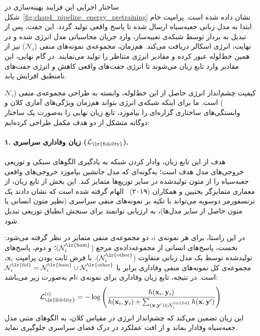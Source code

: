 ساختار اجرایی این فرایند بهینه‌سازی در شکل~\ref{fig:chap4_pipeline_energy_pretraining} نشان داده شده است. پرامپت خام ابتدا به مدل زبانی جعبه‌سیاه ارسال شده تا پاسخ واقعی تولید گردد. این جفت، پس از تبدیل به بردار توسط شبکه‌ی تعبیه‌ساز، وارد جریان محاسباتی مدل انرژی شده و در نهایت، انرژی اسکالر دریافت می‌کند. هم‌زمان، مجموعه‌ی نمونه‌های منفی ($\mathcal{N}_i$) نیز از همین خط‌لوله عبور کرده و مقادیر انرژی متناظر را تولید می‌نمایند. در گام نهایی، این مقادیر وارد تابع زیان  می‌شوند تا انرژی جفت‌های واقعی کاهش و انرژی جفت‌های نامنطبق افزایش یابد.

کیفیت چشم‌انداز انرژی حاصل از این خط‌لوله، وابسته به طراحی مجموعه‌ی منفی ($\mathcal{N}_i$) است. ما برای اینکه شبکه‌ی انرژی بتواند هم‌زمان ویژگی‌های آماری کلان و وابستگی‌های ساختاری گزاره‌ای را بیاموزد، تابع زیان نهایی را به‌صورت یک ساختار دوگانه متشکل از دو هدف مکمل طراحی کرده‌ایم:

\paragraph{۱. زیان وفاداری سراسری ($\mathcal{L}_{\text{\lr{fidelity}}}$).}
هدف از این تابع زیان، وادار کردن شبکه به یادگیری الگوهای سبکی و توزیعی خروجی‌های مدل هدف است؛ به‌گونه‌ای که مدل جانشین بیاموزد خروجی‌های واقعی جعبه‌سیاه را از متون تولیدشده در سایر توزیع‌ها متمایز کند. این بخش از تابع زیان، از معماری  متمایزگر بختیین و همکاران (۲۰۱۹)~\cite{bakhtin2019realfake} الهام گرفته شده است که نشان دادند یک ترنسفورمر دوسویه می‌تواند با تکیه بر نمونه‌های منفی سراسری (نظیر متون انسانی یا متون حاصل از سایر مدل‌ها)، به ارزیابی توانمند برای سنجش انطباق توزیعی تبدیل شود. 

در این راستا، برای هر نمونه‌ی $i$، دو مجموعه‌ی منفی متمایز در نظر گرفته می‌شود: نخست، پاسخ‌های انسانی از مجموعه‌داده‌ی مرجع ($\mathcal{N}^{\text{\lr{hum}}}_i$)؛ و دوم، پاسخ‌های تولیدشده توسط یک مدل زبانی متفاوت ($\mathcal{N}^{\text{\lr{other}}}_i$). با فرض ثابت بودن پرامپت $\mathbf{x}_i$، مجموعه‌ی کل نمونه‌های منفی وفاداری برابر با $\mathcal{N}^{\text{\lr{fid}}}_i = \mathcal{N}^{\text{\lr{hum}}}_i \cup \mathcal{N}^{\text{\lr{other}}}_i$ است. در نتیجه، تابع زیان وفاداری برای نمونه‌ی $i$ام به‌صورت زیر می‌باشد:
\begin{equation}\label{eq:chap4_loss_fidelity}
    \mathcal{L}_{\text{\lr{fidelity}}}^{(i)} = -\log \left( \frac{h(\mathbf{x}_i, \mathbf{y}_i)}{h(\mathbf{x}_i, \mathbf{y}_i) + \sum_{(\mathbf{x},\mathbf{y}') \in \mathcal{N}^{\text{\lr{fid}}}_i} h(\mathbf{x}, \mathbf{y}')} \right)
\end{equation}
این زیان تضمین می‌کند که چشم‌انداز انرژی در مقیاس کلان، به الگوهای متنی مدل جعبه‌سیاه وفادار بماند و از افت عملکرد در درک فضای سراسری جلوگیری نماید.

